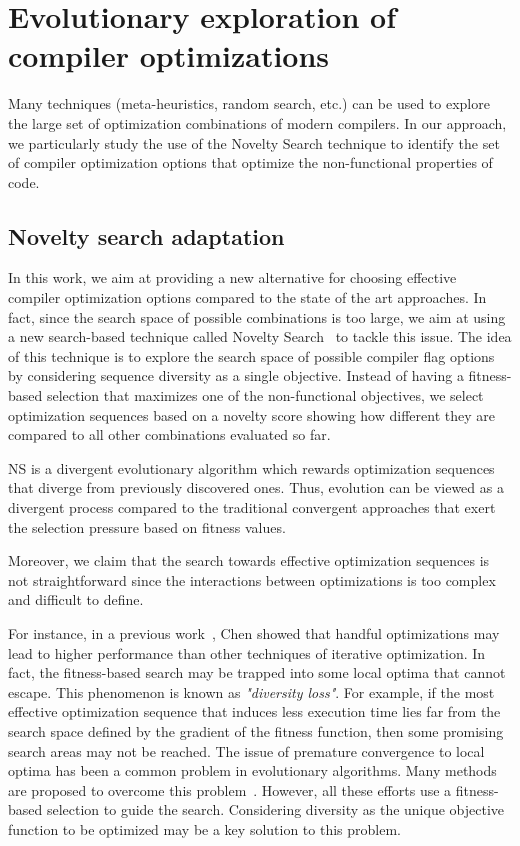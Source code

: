 \section{Evolutionary exploration of compiler optimizations}
\label{sec:comp-NS}
Many techniques (meta-heuristics, random search, etc.) can be used to explore the large set of optimization combinations of modern compilers. 
In our approach, we particularly study the use of the Novelty Search technique to identify the set of compiler optimization options that optimize the non-functional properties of code.

\subsection{Novelty search adaptation}

In this work, we aim at providing a new alternative for choosing effective compiler optimization options compared to the state of the art approaches. 
In fact, since the search space of possible combinations is too large, we aim at using a new search-based technique called Novelty Search~\cite{lehman2008exploiting} to tackle this issue. 
The idea of this technique is to explore the search space of possible compiler flag options by considering sequence diversity as a single objective. 
Instead of having a fitness-based selection that maximizes one of the non-functional objectives, we select optimization sequences based on a novelty score showing how different they are compared to all other combinations evaluated so far. 

NS is a divergent evolutionary algorithm which rewards optimization sequences that diverge from previously discovered ones. Thus, evolution can be viewed as a divergent process compared to the traditional convergent approaches that exert the selection pressure based on fitness values.

Moreover, we claim that the search towards effective optimization sequences is not straightforward since the interactions between optimizations is too complex and difficult to define. 

For instance, in a previous work~\cite{chen2012deconstructing}, Chen \etal showed that handful optimizations may lead to higher performance than other techniques of iterative optimization. 
In fact, the fitness-based search may be trapped into some local optima that cannot escape\cite{bodin1998iterative}. 
This phenomenon is known as \textit{"diversity loss"}. For example, if the most effective optimization sequence that induces less execution time lies far from the search space defined by the gradient of the fitness function, then some promising search areas may not be reached. 
The issue of premature convergence to local optima has been a common problem in evolutionary algorithms. 
Many methods are proposed to overcome this problem~\cite{banzhaf1996effect}. 
However, all these efforts use a fitness-based selection to guide the search. Considering diversity as the unique objective function to be optimized may be a key solution to this problem.

